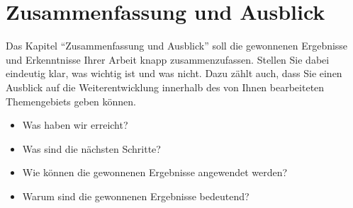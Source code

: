 %
\section{Zusammenfassung und Ausblick}
\label{sec_conclusion}

Das Kapitel "`Zusammenfassung und Ausblick"' soll die gewonnenen Ergebnisse und Erkenntnisse Ihrer Arbeit knapp zusammenzufassen.
Stellen Sie dabei eindeutig klar, was wichtig ist und was nicht.
Dazu zählt auch, dass Sie einen Ausblick auf die Weiterentwicklung innerhalb des von Ihnen bearbeiteten Themengebiets geben können.
\begin{itemize}
\item Was haben wir erreicht?
\item Was sind die nächsten Schritte?
\item Wie können die gewonnenen Ergebnisse angewendet werden?
\item Warum sind die gewonnenen Ergebnisse bedeutend?
\end{itemize}
